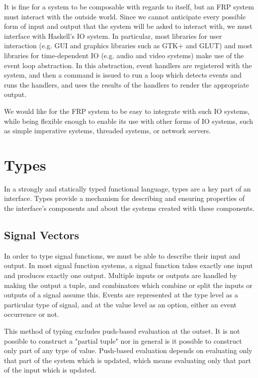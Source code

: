 It is fine for a system to be composable with regards to itself, but an FRP
system must interact with the outside world. Since we cannot anticipate every
possible form of input and output that the system will be asked to interact
with, we must interface with Haskell's IO system. In particular, most libraries
for user interaction (e.g. GUI and graphics libraries such as GTK+ and GLUT) and
most libraries for time-dependent IO (e.g. audio and video systems) make use of
the event loop abstraction. In this abstraction, event handlers are registered
with the system, and then a command is issued to run a loop which detects events
and runs the handlers, and uses the results of the handlers to render the
appropriate output. 

We would like for the FRP system to be easy to integrate with such IO systems,
while being flexible enough to enable its use with other forms of IO systems,
such as simple imperative systems, threaded systems, or network servers.

\section{Types}
\label{section:System_Design_and_Interface-Types}

In a strongly and statically typed functional language, types are a key part of
an interface. Types provide a mechanism for describing and ensuring properties
of the interface's components and about the systems created with these
components. 

\subsection{Signal Vectors}
\label{subsection:System_Design_and_Interface-Types-Signal_Vectors}

In order to type signal functions, we must be able to describe their input and
output. In most signal function systems, a signal function takes exactly one
input and produces exactly one output. Multiple inputs or outputs are handled
by making the output a tuple, and combinators which combine or split the inputs
or outputs of a signal assume this. Events are represented at the type level
as a particular type of signal, and at the value level as an option, either an
event occurrence or not.

This method of typing excludes push-based evaluation at the outset.
It is not possible to construct a "partial tuple" nor in general is it possible
to construct only part of any type of value. Push-based evaluation depends on
evaluating only that part of the system which is updated, which means evaluating
only that part of the input which is updated.


